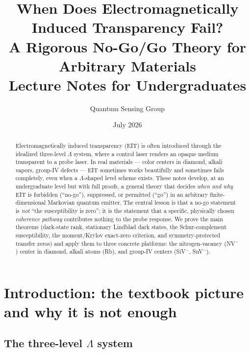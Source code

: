 \documentclass[11pt,a4paper]{article}
\title{\bfseries When Does Electromagnetically Induced Transparency Fail?\\[4pt]
\Large A Rigorous No-Go/Go Theory for Arbitrary Materials\\[4pt]
\large Lecture Notes for Undergraduates}
\author{Quantum Sensing Group}
\date{July 2026}
\theoremstyle{remark}
\begin{document}
\maketitle

\begin{abstract}
Electromagnetically induced transparency (EIT) is often introduced through the
idealized three-level $\Lambda$ system, where a control laser renders an opaque
medium transparent to a probe laser. In real materials --- color centers in
diamond, alkali vapors, group-IV defects --- EIT sometimes works beautifully and
sometimes fails completely, even when a $\Lambda$-shaped level scheme exists.
These notes develop, at an undergraduate level but with full proofs, a general
theory that decides \emph{when and why} EIT is forbidden (``no-go''), suppressed,
or permitted (``go'') in an arbitrary finite-dimensional Markovian quantum
emitter. The central lesson is that a no-go statement is \emph{not}
``the susceptibility is zero''; it is the statement that a specific,
physically chosen \emph{coherence pathway} contributes nothing to the probe
response. We prove the main theorems (dark-state rank, stationary Lindblad dark
states, the Schur-complement susceptibility, the moment/Krylov exact-zero
criterion, and symmetry-protected transfer zeros) and apply them to three
concrete platforms: the nitrogen-vacancy (NV$^-$) center in diamond, alkali
atoms (Rb), and group-IV centers (SiV$^-$, SnV$^-$).
\end{abstract}

\tableofcontents

\section{Introduction: the textbook picture and why it is not enough}

\subsection{The three-level $\Lambda$ system}
\end{document}
